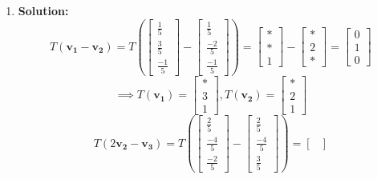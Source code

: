 \documentclass[letterpaper,12pt]{article}
\theoremstyle{definition}
\begin{document}
\begin{enumerate}
    \item[] \begin{mdframed}
        \textbf{Solution:}
        $$T(\mathbf{v_1} - \mathbf{v_2}) = T\left (\begin{bmatrix}
            \frac{1}{5} \\ \frac{3}{5} \\ \frac{-1}{5}
        \end{bmatrix} - \begin{bmatrix}
            \frac{1}{5} \\ \frac{-2}{5} \\ \frac{-1}{5}
        \end{bmatrix}\right ) = \begin{bmatrix}
                * \\ * \\ 1
            \end{bmatrix} - \begin{bmatrix}
                * \\ 2 \\ *
            \end{bmatrix} = \begin{bmatrix}
                0 \\ 1 \\ 0
            \end{bmatrix}$$
            $$\implies T(\mathbf{v_1}) =\begin{bmatrix}
                * \\ 3 \\ 1
            \end{bmatrix}, T(\mathbf{v_2}) =\begin{bmatrix}
                * \\ 2 \\ 1
            \end{bmatrix}$$
            $$T(2\mathbf{v_2}-\mathbf{v_3}) = T\left(\begin{bmatrix}
            \frac{2}{5} \\ \frac{-4}{5} \\ \frac{-2}{5}
        \end{bmatrix} -\begin{bmatrix}
            \frac{2}{5} \\ \frac{-4}{5} \\ \frac{3}{5}
        \end{bmatrix}\right ) = \begin{bmatrix}

\end{bmatrix}$$
\end{mdframed}
\end{enumerate}
\end{document}
